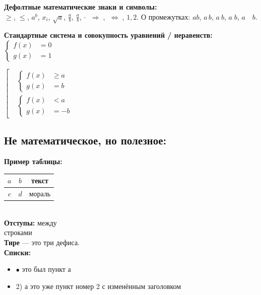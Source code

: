 \documentclass[12pt]{article}
\newenvironment{mylist} %
{ \begin{itemize}
    \setlength{\itemsep}{0pt}
    \setlength{\parskip}{0pt}
    \setlength{\parsep}{0pt}     }
{ \end{itemize}                  }
\begin{document}
\textbf{Дефолтные математические знаки и символы:}\\
$\geqslant$,
$\leqslant$,
$a^{b}$,
$x_{i}$,
$\sqrt{a}$,
$\frac{a}{b}$,
$\displaystyle \frac{a}{b}$,
$\cdot$
$\;\Rightarrow\;$,
$\;\Leftrightarrow\;$,
$1{,}2$.
О промежутках:
$a\!b$,
$a\,b$,
$a\:b$,
$a\;b$,
$a\quad b$.

\textbf{Стандартные система и совокупность уравнений / неравенств:}\\
$\left\{
\begin{aligned}
f(x) &= 0 \\
g(x) &= 1
\end{aligned}\right.$

$\left[\begin{aligned}
&\left\{\begin{aligned}
f(x) &\geqslant a \\
g(x) &= b
\end{aligned}\right.\\
&\left\{\begin{aligned}
f(x) &< a \\
g(x) &= -b
\end{aligned}\right.
\end{aligned}\right.$

\subsection*{\textcolor{Emerald}{\textbf{Не математическое, но полезное:}}}
\textbf{Пример таблицы:}

\begin{tabular}{|c|c|c|}
\hline
    $a$ & $b$ & текст
\\\hline
    $c$ & $d$ & мораль
\\\hline
\end{tabular}\\

\textbf{Отступы:} между\smallskip\\ строками\medskip\\ \textbf{Тире} --- это три дефиса.\\
\textbf{Списки:}
\begin{mylist}
\item [$\bullet$] это был пункт а
\item [2)] а это уже пункт номер 2 с изменённым заголовком
\end{mylist}
\end{document}
